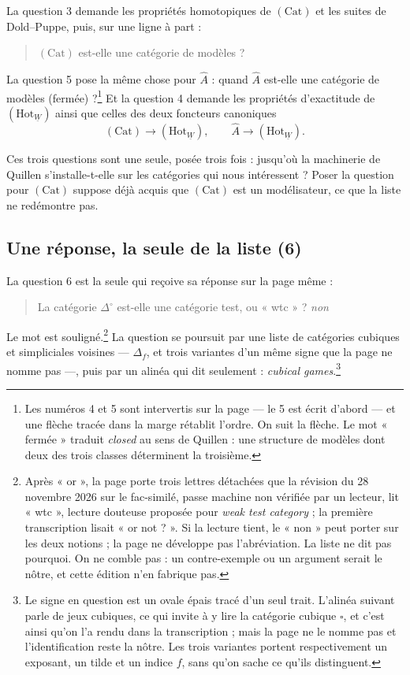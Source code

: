 \documentclass[11pt,a4paper]{article}
\begin{document}
La question 3 demande les propriétés homotopiques de $(\mathrm{Cat})$ et les
suites de Dold--Puppe, puis, sur une ligne à part :

\begin{quote}
$(\mathrm{Cat})$ est-elle une catégorie de modèles ?
\end{quote}

La question 5 pose la même chose pour $\hat{A}$ : quand $\hat{A}$ est-elle une
catégorie de modèles (fermée) ?\footnote{Les numéros 4 et 5 sont intervertis sur
la page --- le 5 est écrit d'abord --- et une flèche tracée dans la marge
rétablit l'ordre. On suit la flèche. Le mot « fermée » traduit \emph{closed} au
sens de Quillen : une structure de modèles dont deux des trois classes
déterminent la troisième.} Et la question 4 demande les propriétés
d'exactitude de $(\mathrm{Hot}_{\underline{W}})$ ainsi que celles des deux
foncteurs canoniques
\[
(\mathrm{Cat}) \longrightarrow (\mathrm{Hot}_{\underline{W}}),
\qquad
\hat{A} \longrightarrow (\mathrm{Hot}_{\underline{W}}).
\]

Ces trois questions sont une seule, posée trois fois : jusqu'où la machinerie de
Quillen s'installe-t-elle sur les catégories qui nous intéressent ? Poser la
question pour $(\mathrm{Cat})$ suppose déjà acquis que $(\mathrm{Cat})$ est un
modélisateur, ce que la liste ne redémontre pas.

\subsection*{Une réponse, la seule de la liste (6)}

La question 6 est la seule qui reçoive sa réponse sur la page même :

\begin{quote}
La catégorie $\Delta^{\circ}$ est-elle une catégorie test, ou « wtc » ? \emph{non}
\end{quote}

Le mot est souligné.\footnote{Après « or », la page porte trois lettres
détachées que la révision du 28 novembre 2026 sur le fac-similé, passe machine non vérifiée par un lecteur, lit « wtc », lecture douteuse
proposée pour \emph{weak test category} ; la première transcription lisait
« or not ? ». Si la lecture tient, le « non » peut porter sur les deux
notions ; la page ne développe pas l'abréviation. La liste ne dit pas pourquoi. On ne comble pas :
un contre-exemple ou un argument serait le nôtre, et cette édition n'en
fabrique pas.} La question se poursuit par une liste de catégories cubiques et
simpliciales voisines --- $\Delta_{f}$, et trois variantes d'un même signe que
la page ne nomme pas ---, puis par un alinéa qui dit seulement :
\emph{cubical games}.\footnote{Le signe en question est un ovale épais tracé
d'un seul trait. L'alinéa suivant parle de jeux cubiques, ce qui invite à y lire
la catégorie cubique $\square$, et c'est ainsi qu'on l'a rendu dans la
transcription ; mais la page ne le nomme pas et l'identification reste la nôtre.
Les trois variantes portent respectivement un exposant, un tilde et un indice
$f$, sans qu'on sache ce qu'ils distinguent.}
\end{document}
